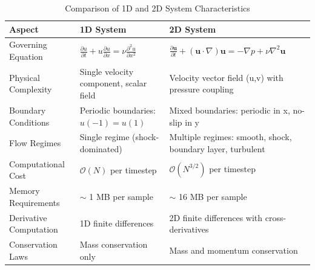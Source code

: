 \documentclass[preprint,12pt,authoryear]{elsarticle}
\begin{document}
\begin{table}[h]
\centering
\caption{Comparison of 1D and 2D System Characteristics}
\begin{tabular}{|p{}|p{}|p{}|}
\hline
\textbf{Aspect} & \textbf{1D System} & \textbf{2D System} \\ 
\hline
Governing Equation & $\displaystyle\frac{\partial u}{\partial t} + u\frac{\partial u}{\partial x} = \nu\frac{\partial^2 u}{\partial x^2}$ & $\displaystyle\frac{\partial\mathbf{u}}{\partial t} + (\mathbf{u}\cdot\nabla)\mathbf{u} = -\nabla p + \nu\nabla^2\mathbf{u}$ \\ 
\hline
Physical Complexity & Single velocity component, scalar field & Velocity vector field (u,v) with pressure coupling \\
\hline
Boundary Conditions & Periodic boundaries: $u(-1) = u(1)$ & Mixed boundaries: periodic in x, no-slip in y \\
\hline
Flow Regimes & Single regime (shock-dominated) & Multiple regimes: smooth, shock, boundary layer, turbulent \\
\hline
Computational Cost & $\mathcal{O}(N)$ per timestep & $\mathcal{O}(N^{3/2})$ per timestep \\
\hline
Memory Requirements & $\sim$ 1 MB per sample & $\sim$ 16 MB per sample \\
\hline
Derivative Computation & 1D finite differences & 2D finite differences with cross-derivatives \\
\hline
Conservation Laws & Mass conservation only & Mass and momentum conservation \\
\hline
\end{tabular}
\label{table:problem_domain}
\end{table}



\end{document}
